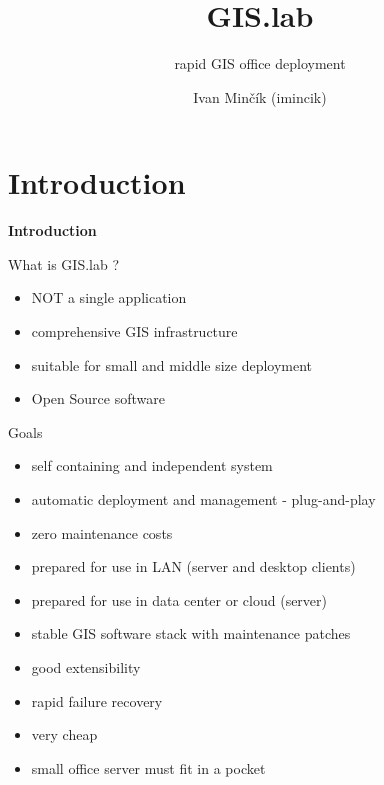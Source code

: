 \documentclass[12pt]{beamer}
\title{GIS.lab}
\subtitle{rapid GIS office deployment}
\author{Ivan Minčík (imincik)}
\institute{FOSS4G-Europe 2014, Bremen}
\date{}
\begin{document}
\begin{frame}
	\titlepage
\end{frame}


\section{Introduction}
\begin{frame}
	\begin{center}
		\LARGE\textbf{Introduction}	
	\end{center}
\end{frame}


\begin{frame}{What is GIS.lab ?}
	\begin{itemize}[<+->]
		\item NOT a single application
		\item comprehensive GIS infrastructure
		\item suitable for small and middle size deployment
		\item Open Source software
	\end{itemize}
\end{frame}


\begin{frame}{Goals}
	\begin{itemize}[<+->]
		\item self containing and independent system
		\item automatic deployment and management - plug-and-play
		\item zero maintenance costs
		\item prepared for use in LAN (server and desktop clients)
		\item prepared for use in data center or cloud (server)
		\item stable GIS software stack with maintenance patches
		\item good extensibility
		\item rapid failure recovery	
		\item very cheap
		\item small office server must fit in a pocket
	\end{itemize}
\end{frame}
\end{document}
